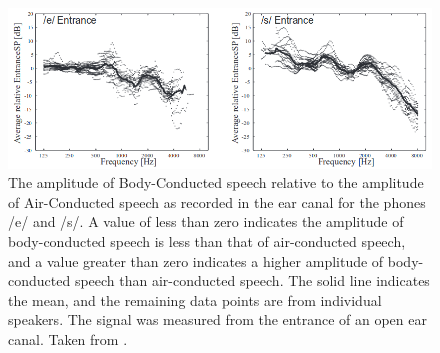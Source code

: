 \begin{figure}[h!]
\includegraphics[width=1\textwidth]{figure/BCrelAC_e_s.png}
\caption{The amplitude of Body-Conducted speech relative to the amplitude of Air-Conducted  speech as recorded in the ear canal for the phones /e/ and /s/.  A value of less than zero indicates the amplitude of body-conducted speech is less than that of air-conducted speech, and a value greater than zero indicates a higher amplitude of body-conducted speech than air-conducted speech. The solid line indicates the mean, and the remaining data points are from individual speakers.  The signal was measured from the entrance of an open ear canal.  Taken from \cite{reinfeldt:10}.}
\label{BCrelAC}
\end{figure}

